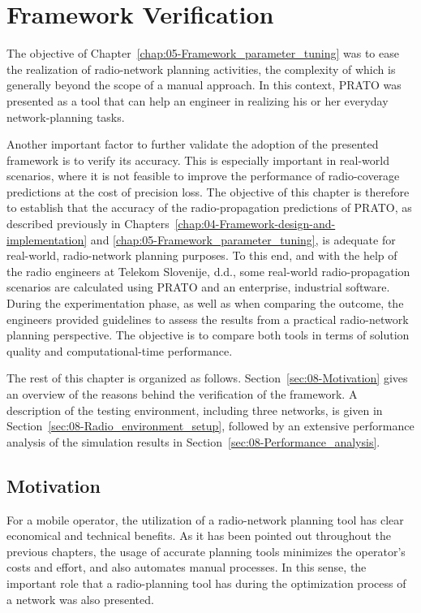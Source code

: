 
\chapter{Framework Verification \label{chap:08-Real-world_network_planning}}


\noindent The objective of Chapter~\ref{chap:05-Framework_parameter_tuning}
was to ease the realization of radio-network planning activities,
the complexity of which is generally beyond the scope of a manual
approach. In this context, PRATO was presented as a tool that can
help an engineer in realizing his or her everyday network-planning
tasks.

Another important factor to further validate the adoption of the presented
framework is to verify its accuracy. This is especially important
in real-world scenarios, where it is not feasible to improve the performance
of radio-coverage predictions at the cost of precision loss. The objective
of this chapter is therefore to establish that the accuracy of the
radio-propagation predictions of PRATO, as described previously in
Chapters~\ref{chap:04-Framework-design-and-implementation} and \ref{chap:05-Framework_parameter_tuning},
is adequate for real-world, radio-network planning purposes. To this
end, and with the help of the radio engineers at Telekom Slovenije,
d.d., some real-world radio-propagation scenarios are calculated using
PRATO and an enterprise, industrial software. During the experimentation
phase, as well as when comparing the outcome, the engineers provided
guidelines to assess the results from a practical radio-network planning
perspective. The objective is to compare both tools in terms of solution
quality and computational-time performance. 

The rest of this chapter is organized as follows. Section~\ref{sec:08-Motivation}
gives an overview of the reasons behind the verification of the framework.
A description of the testing environment, including three networks,
is given in Section~\ref{sec:08-Radio_environment_setup}, followed
by an extensive performance analysis of the simulation results in
Section~\ref{sec:08-Performance_analysis}.


\section{Motivation \label{sec:08-Motivation}}

For a mobile operator, the utilization of a radio-network planning
tool has clear economical and technical benefits. As it has been pointed
out throughout the previous chapters, the usage of accurate planning
tools minimizes the operator's costs and effort, and also automates
manual processes. In this sense, the important role that a radio-planning
tool has during the optimization process of a network was also presented. 

